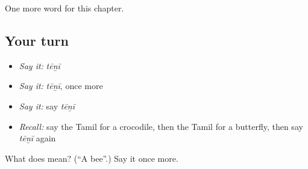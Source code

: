 \begin{grammarlens}[title={What you've built}]
One more word for this chapter.
\end{grammarlens}

\subsection*{Your turn}
\begin{itemize}
\raggedright
  \item \emph{Say it:} \emph{tēṉī}
  \item \emph{Say it:} \emph{tēṉī}, once more
  \item \emph{Say it:} say \emph{tēṉī}
  \item \emph{Recall:} say the Tamil for a crocodile, then the Tamil for a butterfly, then say \emph{tēṉī} again
\end{itemize}

\begin{tcolorbox}[breakable,colback=teal!4,colframe=teal!35!black,title={Before you move on}]
What does  mean? (\textquotedblleft{}A bee\textquotedblright{}.) Say it once more.
\end{tcolorbox}
